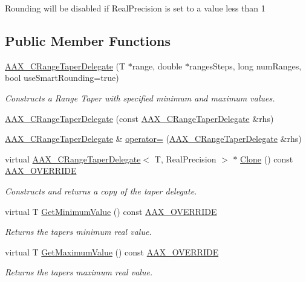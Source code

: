 Rounding will be disabled if Real\+Precision is set to a value less than 1 \subsection*{Public Member Functions}
\begin{DoxyCompactItemize}
\item 
\hyperlink{a00038_a06236d6426f76ff4f7a1d51e9dec5b8c}{A\+A\+X\+\_\+\+C\+Range\+Taper\+Delegate} (T $\ast$range, double $\ast$ranges\+Steps, long num\+Ranges, bool use\+Smart\+Rounding=true)
\begin{DoxyCompactList}\small\item\em Constructs a Range Taper with specified minimum and maximum values. \end{DoxyCompactList}\item 
\hyperlink{a00038_a4c2f8d8cad37e465c16008628d8a9282}{A\+A\+X\+\_\+\+C\+Range\+Taper\+Delegate} (const \hyperlink{a00038}{A\+A\+X\+\_\+\+C\+Range\+Taper\+Delegate} \&rhs)
\item 
\hyperlink{a00038}{A\+A\+X\+\_\+\+C\+Range\+Taper\+Delegate} \& \hyperlink{a00038_abb6a95a43a8614a1c83fc84208d2e8f1}{operator=} (\hyperlink{a00038}{A\+A\+X\+\_\+\+C\+Range\+Taper\+Delegate} \&rhs)
\item 
virtual \hyperlink{a00038}{A\+A\+X\+\_\+\+C\+Range\+Taper\+Delegate}$<$ T, Real\+Precision $>$ $\ast$ \hyperlink{a00038_a787f7649ff4b94af1642bfa0198007a2}{Clone} () const \hyperlink{a00149_ac2f24a5172689ae684344abdcce55463}{A\+A\+X\+\_\+\+O\+V\+E\+R\+R\+I\+D\+E}
\begin{DoxyCompactList}\small\item\em Constructs and returns a copy of the taper delegate. \end{DoxyCompactList}\item 
virtual T \hyperlink{a00038_abda4ad2579e44a019fc44a849af74e0a}{Get\+Minimum\+Value} () const \hyperlink{a00149_ac2f24a5172689ae684344abdcce55463}{A\+A\+X\+\_\+\+O\+V\+E\+R\+R\+I\+D\+E}
\begin{DoxyCompactList}\small\item\em Returns the taper\textquotesingle{}s minimum real value. \end{DoxyCompactList}\item 
virtual T \hyperlink{a00038_a86e8d7ea4e2788d68aa8025c6767593b}{Get\+Maximum\+Value} () const \hyperlink{a00149_ac2f24a5172689ae684344abdcce55463}{A\+A\+X\+\_\+\+O\+V\+E\+R\+R\+I\+D\+E}
\begin{DoxyCompactList}\small\item\em Returns the taper\textquotesingle{}s maximum real value. \end{DoxyCompactList}\item 

\end{DoxyCompactItemize}

